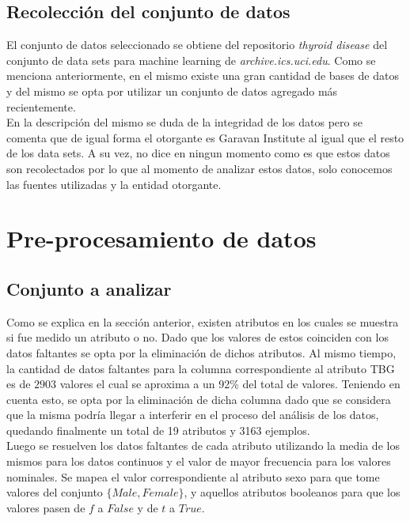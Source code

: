 \documentclass[osajnl,twocolumn,showpacs,superscriptaddress,10pt,floatfix]{revtex4-1} %
\begin{document}
\subsection{Recolección del conjunto de datos}

El conjunto de datos seleccionado se obtiene del repositorio \textit{thyroid disease} del conjunto de data sets para machine learning de \textit{archive.ics.uci.edu}. Como se menciona anteriormente, en el mismo existe una gran cantidad de bases de datos y del mismo se opta por utilizar un conjunto de datos agregado más recientemente. \\

En la descripción del mismo se duda de la integridad de los datos pero se comenta que de igual forma el otorgante es Garavan Institute al igual que el resto de los data sets. A su vez, no dice en ningun momento como es que estos datos son recolectados por lo que al momento de analizar estos datos, solo conocemos las fuentes utilizadas y la entidad otorgante. \\

\section{Pre-procesamiento de datos}
\subsection{Conjunto a analizar}

Como se explica en la sección anterior, existen atributos en los cuales se muestra si fue medido un atributo o no. Dado que los valores de estos coinciden con los datos faltantes se opta por la eliminación de dichos atributos. Al mismo tiempo, la cantidad de datos faltantes para la columna correspondiente al atributo TBG es de $2903$ valores el cual se aproxima a un 92\% del total de valores. Teniendo en cuenta esto, se opta por la eliminación de dicha columna dado que se considera que la misma podría llegar a interferir en el proceso del análisis de los datos, quedando finalmente un total de 19 atributos y 3163 ejemplos. \\

Luego se resuelven los datos faltantes de cada atributo utilizando la media de los mismos para los datos continuos y el valor de mayor frecuencia para los valores nominales. Se mapea el valor correspondiente al atributo sexo para que tome valores del conjunto $\{Male, Female\}$, y aquellos atributos booleanos para que los valores pasen de $f$ a $False$ y de $t$ a $True$. \\
\end{document}
